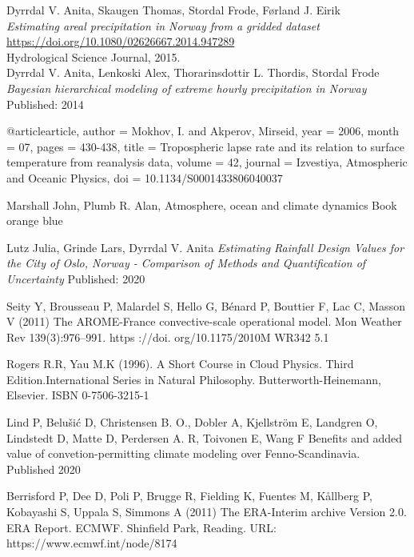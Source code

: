 \begin{thebibliography}{9}

Dyrrdal V. Anita, Skaugen Thomas, Stordal Frode, Førland J. Eirik \\
\textit{Estimating areal precipitation in Norway from a gridded dataset}\\
\url{https://doi.org/10.1080/02626667.2014.947289} \\
Hydrological Science Journal, 2015.\\

Dyrrdal V. Anita, Lenkoski Alex, Thorarinsdottir L. Thordis, Stordal Frode
\textit{Bayesian hierarchical modeling of extreme hourly precipitation in Norway}
Published: 2014

@article{article,
author = {Mokhov, I. and Akperov, Mirseid},
year = {2006},
month = {07},
pages = {430-438},
title = {Tropospheric lapse rate and its relation to surface temperature from reanalysis data},
volume = {42},
journal = {Izvestiya, Atmospheric and Oceanic Physics},
doi = {10.1134/S0001433806040037}
}

Marshall John, Plumb R. Alan, Atmosphere, ocean and climate dynamics
Book orange blue

Lutz Julia, Grinde Lars, Dyrrdal V. Anita
\textit{Estimating Rainfall Design Values for the City of Oslo, Norway - Comparison of Methods and Quantification of Uncertainty}
Published: 2020

Seity Y, Brousseau P, Malardel S, Hello G, Bénard P, Bouttier F,
Lac C, Masson V (2011) The AROME-France convective-scale
operational model. Mon Weather Rev 139(3):976–991. https ://doi.
org/10.1175/2010M WR342 5.1

Rogers R.R, Yau M.K (1996). A Short Course in Cloud Physics. Third Edition.International Series in Natural Philosophy.
Butterworth-Heinemann, Elsevier.
ISBN 0-7506-3215-1 

Lind P, Belušić D, Christensen B. O., Dobler A, Kjellström E, Landgren O, Lindstedt D, Matte D, Perdersen A. R, Toivonen E, Wang F
Benefits and added value of convetion-permitting climate modeling over Fenno-Scandinavia.
Published 2020

Berrisford P, Dee D, Poli P, Brugge R, Fielding K, Fuentes M, Kållberg P, Kobayashi S, Uppala S, Simmons A (2011)
The ERA-Interim archive Version 2.0. ERA Report. ECMWF. Shinfield Park, Reading. URL: https://www.ecmwf.int/node/8174


\end{thebibliography}

